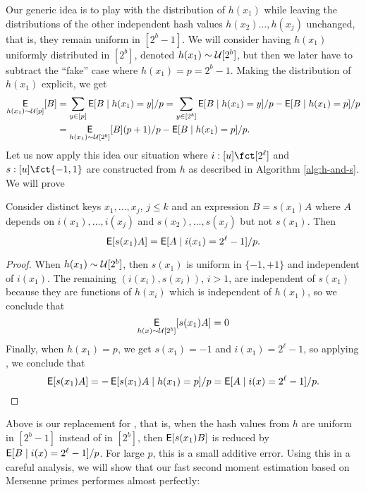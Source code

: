 Our generic idea is to play with the distribution of $h(x_1)$ while
leaving the distributions of the other independent hash values
$h(x_2)\ldots,h(x_j)$ unchanged, that is, they remain uniform in
$[2^b-1]$. We will consider having $h(x_1)$ uniformly distributed in
$[2^b]$, denoted $h(x_1) \sim \mathcal{U}[2^b]$, but then we later have to
subtract the ``fake'' case where $h(x_1)=p=2^b-1$.  Making the
distribution of $h(x_1)$ explicit, we get
\begin{equation}\begin{split}
  \operatorname*{\sf{E}}_{h(x_1) \sim \mathcal{U}[p]}[B]&=\sum_{y\in[p]}\operatorname*{\sf{E}}[B \mid h(x_1)=y]/p
  =\sum_{y\in[2^b]}\operatorname*{\sf{E}}[B \mid h(x_1)=y]/p - \operatorname*{\sf{E}}[B \mid h(x_1)=p]/p \\
  &=\operatorname*{\sf{E}}_{h(x_1) \sim \mathcal{U}[2^b]}[B](p+1)/p - \operatorname*{\sf{E}}[B \mid h(x_1)=p]/p.\label{eq:play-with-dist}
\end{split}\end{equation}
Let us now apply this idea our situation where $i:[u]\fct[2^\ell]$ and
$s:[u]\fct\{-1,1\}$ are constructed from $h$ as described in Algorithm
\ref{alg:h-and-s}. We will prove
\begin{lemma}\label{lem:remove-si}  Consider distinct keys $x_1,\ldots,x_j$, $j\leq k$ and an expression $B=s(x_1)A$ where $A$
depends on $i(x_1),\ldots,i(x_j)$ and $s(x_2),\ldots,s(x_j)$ but not
$s(x_1)$. Then
\begin{equation}\label{eq:remove-si}
  \operatorname*{\sf{E}}[s(x_1)A]=\operatorname*{\sf{E}}[A\mid i(x_1)=2^\ell-1]/p.
\end{equation}
\end{lemma}
\begin{proof}
When $h(x_1) \sim \mathcal{U}[2^b]$, then $s(x_1)$ is uniform
in $\{-1,+1\}$ and independent of $i(x_1)$. The remaining
$(i(x_i),s(x_i))$, $i>1$, are independent of $s(x_1)$ because they
are functions of $h(x_i)$ which is independent of $h(x_1)$, so
we conclude that 
\[\operatorname*{\sf{E}}_{h(x) \sim \mathcal{U}[2^b]}[s(x_1)A]=0\]
Finally, when $h(x_1)=p$, we get $s(x_1)=-1$ and $i(x_1)=2^\ell-1$, 
so applying , we conclude
that 
\[\operatorname*{\sf{E}}[s(x_1)A] = -\operatorname*{\sf{E}}[s(x_1) A \mid h(x_1) = p]/p = \operatorname*{\sf{E}}[A \mid i(x)=2^\ell-1]/p.\]
\end{proof}
Above  is our replacement for , that is,
when the hash values from $h$ are uniform in $[2^b-1]$ instead of
in $[2^b]$, then $\operatorname*{\sf{E}}[s(x_1)B]$ is reduced by $\operatorname*{\sf{E}}[B \mid i(x)=2^\ell-1]/p$.
For large $p$, this is a small additive error. Using this in a careful
analysis, we will show that our fast second moment estimation 
based on Mersenne primes performes almost perfectly:

